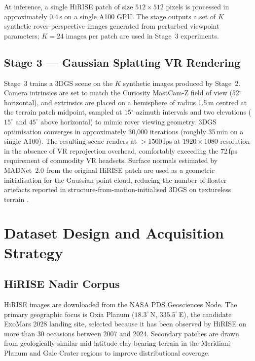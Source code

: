 \documentclass[10pt,journal]{IEEEtran}
\begin{document}
At inference, a single HiRISE patch of size $512 \times 512$ pixels is processed
in approximately 0.4\,s on a single A100 GPU. The stage outputs a set of $K$
synthetic rover-perspective images generated from perturbed viewpoint parameters;
$K = 24$ images per patch are used in Stage~3 experiments.

\subsection{Stage 3 --- Gaussian Splatting VR Rendering}
Stage~3 trains a 3DGS scene \cite{kerbl2023gaussian} on the $K$ synthetic images
produced by Stage~2. Camera intrinsics are set to match the Curiosity
MastCam-Z field of view (52$^{\circ}$ horizontal), and extrinsics are placed on
a hemisphere of radius 1.5\,m centred at the terrain patch midpoint, sampled at
15$^{\circ}$ azimuth intervals and two elevations ($15^{\circ}$ and $45^{\circ}$
above horizontal) to mimic rover viewing geometry. 3DGS optimisation converges
in approximately 30,000 iterations (roughly 35\,min on a single A100). The
resulting scene renders at $>$1500\,fps at $1920 \times 1080$ resolution in the
absence of VR reprojection overhead, comfortably exceeding the 72\,fps requirement
of commodity VR headsets. Surface normals estimated by MADNet~2.0
\cite{tao2021madnet} from the original HiRISE patch are used as a geometric
initialisation for the Gaussian point cloud, reducing the number of floater
artefacts reported in structure-from-motion-initialised 3DGS on textureless
terrain \cite{martinezpetersen2025hifi}.

\section{Dataset Design and Acquisition Strategy}
\label{sec:datasets}

\subsection{HiRISE Nadir Corpus}
HiRISE images are downloaded from the NASA PDS Geosciences Node. The primary
geographic focus is Oxia Planum ($18.3^{\circ}$\,N, $335.5^{\circ}$\,E),
the candidate ExoMars 2028 landing site, selected because it has been observed
by HiRISE on more than 30 occasions between 2007 and 2024. Secondary patches
are drawn from geologically similar mid-latitude clay-bearing terrain in the
Meridiani Planum and Gale Crater regions to improve distributional coverage.
\end{document}
